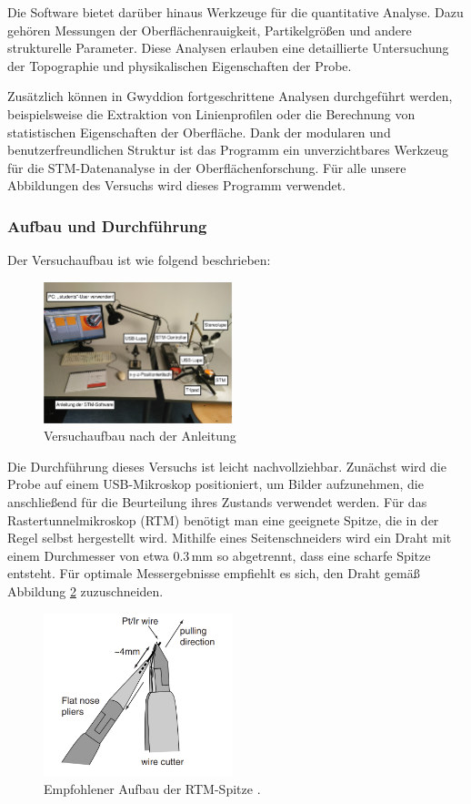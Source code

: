 \documentclass{article}
\begin{document}
Die Software bietet darüber hinaus Werkzeuge für die quantitative Analyse. Dazu gehören Messungen der Oberflächenrauigkeit, Partikelgrößen und andere strukturelle Parameter. Diese Analysen erlauben eine detaillierte Untersuchung der Topographie und physikalischen Eigenschaften der Probe.

Zusätzlich können in Gwyddion fortgeschrittene Analysen durchgeführt werden, beispielsweise die Extraktion von Linienprofilen oder die Berechnung von statistischen Eigenschaften der Oberfläche. Dank der modularen und benutzerfreundlichen Struktur ist das Programm ein unverzichtbares Werkzeug für die STM-Datenanalyse in der Oberflächenforschung. Für alle unsere Abbildungen des Versuchs wird dieses Programm verwendet.

\subsubsection*{Aufbau und Durchführung}
Der Versuchaufbau ist wie folgend beschrieben: 
\begin{figure}[h!]
    \centering
    \includegraphics[width=0.49\textwidth]{aufbau.png}
    \caption{Versuchaufbau nach der Anleitung \cite{Anleitung}}
    \label{fig:aufbau}
\end{figure}

Die Durchführung dieses Versuchs ist leicht nachvollziehbar. Zunächst wird die Probe auf einem
 USB-Mikroskop positioniert, um Bilder aufzunehmen, die anschließend für die Beurteilung 
 ihres Zustands verwendet werden. Für das Rastertunnelmikroskop (RTM) benötigt man eine 
 geeignete Spitze, die in der Regel selbst hergestellt wird. Mithilfe eines Seitenschneiders 
 wird ein Draht mit einem Durchmesser von etwa $0.3 \, \mathrm{mm}$ so abgetrennt, dass 
 eine scharfe Spitze entsteht. Für optimale Messergebnisse empfiehlt es sich, den Draht gemäß 
 Abbildung \ref{fig:spitze_anl} zuzuschneiden.

\begin{figure}[h!]
    \centering
    \includegraphics[width=0.49\textwidth]{spitzeanleitung.png}
    \caption{Empfohlener Aufbau der RTM-Spitze \cite{easyScan}.}
    \label{fig:spitze_anl}
\end{figure}
\end{document}
